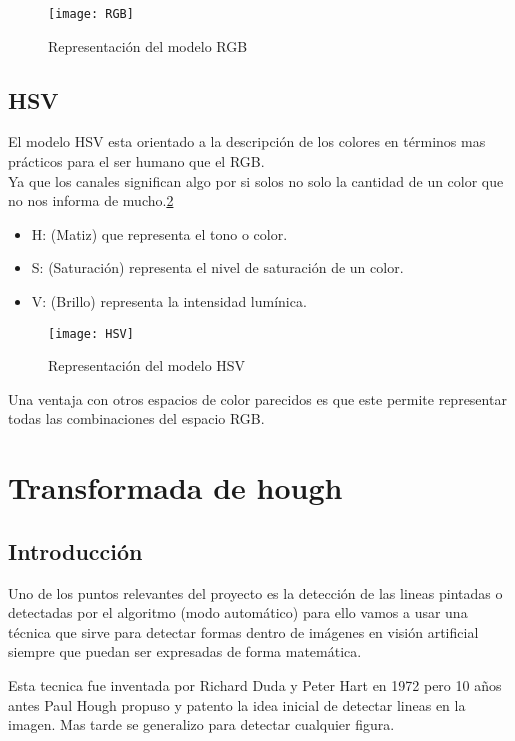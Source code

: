 \begin{figure}[h]
\centering
\texttt{[image: RGB]}
\caption{Representación del modelo RGB\cite{Manual:HAE}}
\label{fig:3.3}
\end{figure}

\subsection{HSV}
El modelo HSV \cite{modelo:hsv} esta orientado a la descripción de los colores en términos mas prácticos para el ser humano que el RGB.\\
Ya que los canales significan algo por si solos no solo la cantidad de un color que no nos informa de mucho.\ref{fig:3.4}
 
\begin{itemize}
	\item H: (Matiz) que representa el tono o color.\\
	\item S: (Saturación) representa el nivel de saturación de un color.\\
	\item V: (Brillo) representa la intensidad lumínica.\\
\end{itemize}
\begin{figure}[h]
\centering
\texttt{[image: HSV]}
\caption{Representación del modelo HSV\cite{Manual:HAE}}
\label{fig:3.4}
\end{figure}
Una ventaja con otros espacios de color parecidos es que este permite representar todas las combinaciones del espacio RGB.

\section{Transformada de hough }

\subsection{Introducción}

Uno de los puntos relevantes del proyecto es la detección de las lineas pintadas o detectadas por el algoritmo (modo automático) para ello vamos a usar una técnica que sirve para detectar formas dentro de imágenes en visión artificial siempre que puedan ser expresadas de forma matemática.

Esta tecnica fue inventada por Richard Duda y Peter Hart en 1972 pero 10 años antes Paul Hough propuso y patento \cite{pat:patHough} la idea inicial de detectar lineas en la imagen. Mas tarde se generalizo para detectar cualquier figura.

